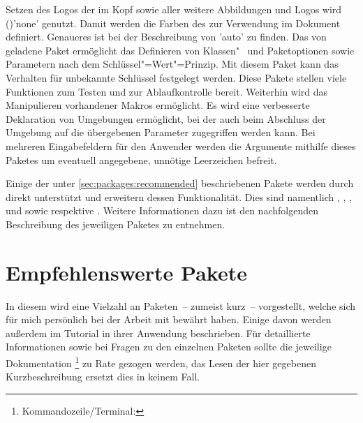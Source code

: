 \begin{DeclarePackages}
  Setzen des Logos der \TnUD im Kopf sowie aller weitere Abbildungen und Logos 
  wird ()'none' genutzt.
  Damit werden die Farben des \CDs zur Verwendung im Dokument definiert. 
  Genaueres ist bei der Beschreibung von 'auto' zu finden. 
  Das von  geladene Paket  ermöglicht das 
  Definieren von Klassen"~ und Paketoptionen sowie Parametern nach dem 
  Schlüssel"=Wert"=Prinzip. Mit diesem Paket kann das Verhalten für unbekannte 
  Schlüssel festgelegt werden.
  Diese Pakete stellen viele Funktionen zum Testen und zur Ablaufkontrolle 
  bereit. Weiterhin wird das Manipulieren vorhandener Makros ermöglicht.
  Es wird eine verbesserte Deklaration von Umgebungen ermöglicht, bei der auch 
  beim Abschluss der Umgebung auf die übergebenen Parameter zugegriffen werden 
  kann. 
  Bei mehreren Eingabefeldern für den Anwender werden die Argumente mithilfe 
  dieses Paketes um eventuell angegebene, unnötige Leerzeichen befreit.
\end{DeclarePackages}



Einige der unter \autoref{sec:packages:recommended} beschriebenen Pakete werden 
durch \TUDScript direkt unterstützt und erweitern dessen Funktionalität. Dies
sind namentlich , , , 
 und  sowie  respektive 
. Weitere Informationen dazu ist den nachfolgenden 
Beschreibung des jeweiligen Paketes zu entnehmen.



\section{%
  Empfehlenswerte Pakete%
  \label{sec:packages:recommended}%
}

In diesem \autorefname wird eine Vielzahl an Paketen~-- zumeist kurz~-- 
vorgestellt, welche sich für mich persönlich bei der Arbeit mit  
bewährt haben. Einige davon werden außerdem im Tutorial  in 
ihrer Anwendung beschrieben. Für detaillierte Informationen sowie bei Fragen zu 
den einzelnen Paketen sollte die jeweilige Dokumentation%
\footnote{Kommandozeile/Terminal: }
zu Rate gezogen werden, das Lesen der hier gegebenen Kurzbeschreibung ersetzt 
dies in keinem Fall.



